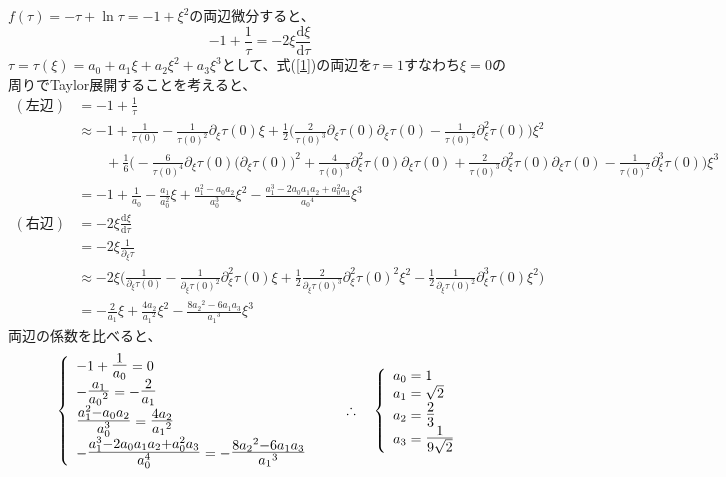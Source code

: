 \documentclass[dvipdfmx,a4paper]{jsarticle}
\begin{document}
\subsection{}
$f(\tau) = - \tau + \ln{\tau} = -1 + \xi ^2$の両辺微分すると、
\begin{equation}
\label{1}
-1  + \frac{1}{\tau} = -2 \xi \frac{\mathrm{d}\xi}{\mathrm{d}\tau}
\end{equation}
$\tau = \tau(\xi) = a_0 + a_1\xi + a_2 \xi^2 + a_3\xi^3$として、式(\ref{1})の両辺を$\tau = 1$すなわち$\xi = 0$の周りでTaylor展開することを考えると、
\begin{align*}
(左辺) &= -1  + \frac{1}{\tau}\\
&\approx -1 + \frac{1}{\tau(0)} - \frac{1}{\tau(0)^2}\partial_{\xi} \tau(0) \xi + \frac{1}{2} \bigr(\frac{2}{\tau(0)^3}\partial_{\xi} \tau(0)\partial_{\xi} \tau(0) - \frac{1}{\tau(0)^2}\partial_{\xi}^2 \tau(0)\bigl) \xi^2 \\
&\qquad+ \frac{1}{6}\bigl( -\frac{6}{\tau(0)^4}\partial_{\xi} \tau(0)\bigl(\partial_{\xi} \tau(0)\bigr)^2 +\frac{4}{\tau(0)^3}\partial_{\xi}^2 \tau(0)\partial_{\xi} \tau(0)  + \frac{2}{\tau(0)^3}\partial_{\xi}^2 \tau(0)\partial_{\xi} \tau(0) - \frac{1}{\tau(0)^2}\partial_{\xi}^3 \tau(0)\bigr) \xi^3\\
&= -1 + \frac{1}{a_0} - \frac{a_1}{a_0^2}\xi  + \frac{a_1^2 - a_0a_2}{a_0^3}\xi^2 -\frac{a_1^3 - 2a_0a_1a_2 + a_0^2a_3}{{a_0}^4}\xi^3\\
(右辺) &= -2 \xi \frac{\mathrm{d}\xi}{\mathrm{d}\tau}\\
&= -2 \xi \frac{1}{\partial_{\xi} \tau}\\
&\approx -2 \xi \biggl(\frac{1}{\partial_{\xi} \tau(0)} - \frac{1}{\partial_{\xi} \tau(0)^2}\partial_{\xi}^2 \tau(0)\xi + \frac{1}{2}\frac{2}{\partial_{\xi} \tau(0)^3}\partial_{\xi}^2 \tau(0)^2\xi^2 -\frac{1}{2}\frac{1}{\partial_{\xi} \tau(0)^2}\partial_{\xi}^3 \tau(0)\xi^2\biggr)\\
&= - \frac{2}{a_1}\xi + \frac{4a_2}{{a_1}^2}\xi^2 -\frac{8{a_2}^2 - 6a_1a_3}{{a_1}^3}\xi^3
\end{align*}
両辺の係数を比べると、
\begin{align*}
\left\{ \begin{array}{ll}
-1 + \mbox{\Large$\frac{1}{a_0}$} = 0 \\
- \mbox{\Large$\frac{{a_1}}{{a_0}^2}$} = - \mbox{\Large$\frac{2}{a_1}$} \\
\mbox{\Large$\frac{a_1^2 - a_0a_2}{a_0^3}$} = \mbox{\Large$\frac{4a_2}{{a_1}^2}$}\\
-\mbox{\Large$\frac{a_1^3 - 2a_0a_1a_2 + a_0^2a_3}{a_0^4}$} = -\mbox{\Large$\frac{8{a_2}^2 - 6a_1a_3}{{a_1}^3}$}
\end{array} \right.
\qquad\therefore \quad
\left\{ \begin{array}{ll}
a_0 = 1 \\
a_1 = \sqrt{2} \\
a_2 = \mbox{\Large$\frac{2}{3}$}\\
a_3 = \mbox{\Large$\frac{1}{9\sqrt{2}}$}
\end{array} \right.
\end{align*}
\end{document}
